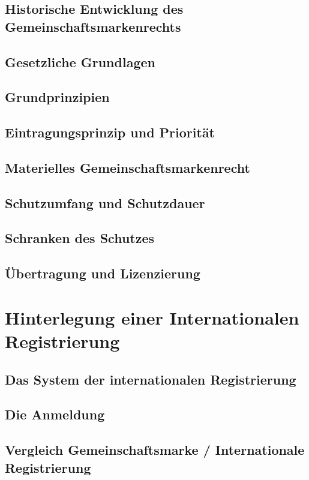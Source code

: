 \documentclass{report}
\begin{document}
\subsection{Historische Entwicklung des Gemeinschaftsmarkenrechts}
\subsection{Gesetzliche Grundlagen}
\subsection{Grundprinzipien}
\subsection{Eintragungsprinzip und Priorität}
\subsection{Materielles Gemeinschaftsmarkenrecht}
\subsection{Schutzumfang und Schutzdauer}
\subsection{Schranken des Schutzes}
\subsection{Übertragung und Lizenzierung}
\section{Hinterlegung einer Internationalen Registrierung}
\subsection{Das System der internationalen Registrierung}
\subsection{Die Anmeldung}
\subsection{Vergleich Gemeinschaftsmarke / Internationale Registrierung}
\end{document}
